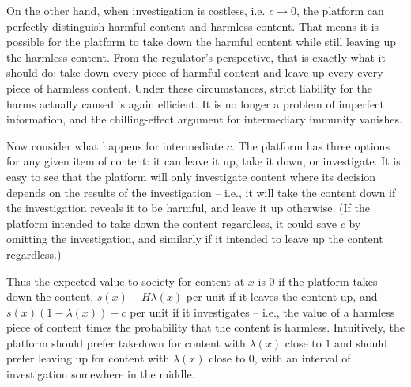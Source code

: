 On the other hand, when investigation is costless, i.e. $c \to 0$, the platform can  perfectly distinguish harmful content and harmless content. That means it is possible for the platform to take down the harmful content while still leaving up the harmless content. From the regulator's perspective, that is exactly what it should do: take down every piece of harmful content and leave up every every piece of harmless content. Under these circumstances, strict liability for the harms actually caused is again efficient. It is no longer a problem of imperfect information, and the chilling-effect argument for intermediary immunity vanishes.

Now consider what happens for intermediate $c$. The platform has three options for any given item of content: it can leave it up, take it down, or investigate. It is easy to see that the platform will only investigate content where its decision depends on the results of the investigation -- i.e.,  it will take the content down if the investigation reveals it to be harmful, and leave it up otherwise. (If the platform intended to take down the content regardless, it could save $c$ by omitting the investigation, and similarly if it intended to leave up the content regardless.)

Thus the expected value to society for content at $x$ is $0$ if the platform takes down the content, $s(x) - H\lambda(x)$ per unit if it leaves the content up, and $s(x)(1 - \lambda(x)) - c$ per unit if it investigates -- i.e., the value of a harmless piece of content times the probability that the content is harmless. Intuitively, the platform should prefer takedown for content with $\lambda(x)$ close to $1$ and should prefer leaving up for content with $\lambda(x)$ close to $0$, with an interval of investigation somewhere in the middle. 

